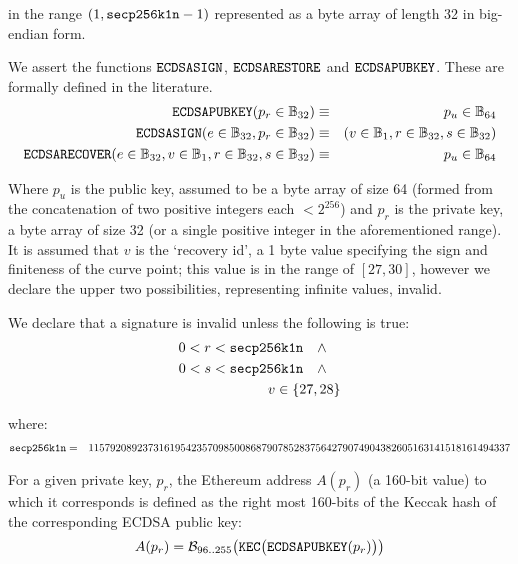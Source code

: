 \documentclass[9pt,oneside]{amsart}
\begin{document}
in the range $(1, \mathtt{\tiny secp256k1n} - 1)$ represented as a byte array of length 32 in big-endian form.

We assert the functions $\mathtt{\small ECDSASIGN}$, $\mathtt{\small ECDSARESTORE}$ and $\mathtt{\small ECDSAPUBKEY}$. These are formally defined in the literature.
\begin{eqnarray}
\mathtt{\small ECDSAPUBKEY}(p_r \in \mathbb{B}_{32}) & \equiv & p_u \in \mathbb{B}_{64} \\
\mathtt{\small ECDSASIGN}(e \in \mathbb{B}_{32}, p_r \in \mathbb{B}_{32}) & \equiv & (v \in \mathbb{B}_{1}, r \in \mathbb{B}_{32}, s \in \mathbb{B}_{32}) \\
\mathtt{\small ECDSARECOVER}(e \in \mathbb{B}_{32}, v \in \mathbb{B}_{1}, r \in \mathbb{B}_{32}, s \in \mathbb{B}_{32}) & \equiv & p_u \in \mathbb{B}_{64}
\end{eqnarray}

Where $p_u$ is the public key, assumed to be a byte array of size 64 (formed from the concatenation of two positive integers each $< 2^{256}$) and $p_r$ is the private key, a byte array of size 32 (or a single positive integer in the aforementioned range). It is assumed that $v$ is the `recovery id', a 1 byte value specifying the sign and finiteness of the curve point; this value is in the range of $[27, 30]$, however we declare the upper two possibilities, representing infinite values, invalid.

We declare that a signature is invalid unless the following is true:
\begin{eqnarray}
0 < r < \mathtt{\tiny secp256k1n} \quad\wedge\quad \\
0 < s < \mathtt{\tiny secp256k1n} \quad\wedge\quad \\
v \in \{27,28\}
\end{eqnarray}

where:
\begin{eqnarray}
\mathtt{\tiny secp256k1n} &=& 115792089237316195423570985008687907852837564279074904382605163141518161494337
\end{eqnarray}

For a given private key, $p_r$, the Ethereum address $A(p_r)$ (a 160-bit value) to which it corresponds is defined as the right most 160-bits of the Keccak hash of the corresponding ECDSA public key:
\begin{equation}
A(p_r) = \mathcal{B}_{96..255}\big(\mathtt{\tiny KEC}\big( \mathtt{\small ECDSAPUBKEY}(p_r) \big) \big)
\end{equation}
\end{document}
